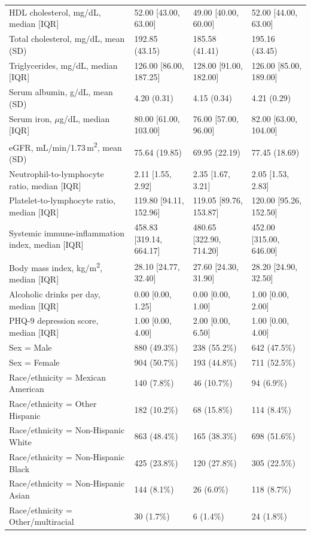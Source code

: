 \documentclass[12pt]{article}
\begin{document}
\begin{singlespace}
\begin{longtable}{p{6.6cm}R{2.6cm}R{2.6cm}R{2.6cm}}
HDL cholesterol, mg/dL, median [IQR] & 52.00 [43.00, 63.00] & 49.00 [40.00, 60.00] & 52.00 [44.00, 63.00] \\
Total cholesterol, mg/dL, mean (SD) & 192.85 (43.15) & 185.58 (41.41) & 195.16 (43.45) \\
Triglycerides, mg/dL, median [IQR] & 126.00 [86.00, 187.25] & 128.00 [91.00, 182.00] & 126.00 [85.00, 189.00] \\
Serum albumin, g/dL, mean (SD) & 4.20 (0.31) & 4.15 (0.34) & 4.21 (0.29) \\
Serum iron, $\mu$g/dL, median [IQR] & 80.00 [61.00, 103.00] & 76.00 [57.00, 96.00] & 82.00 [63.00, 104.00] \\
eGFR, mL/min/1.73\,m\textsuperscript{2}, mean (SD) & 75.64 (19.85) & 69.95 (22.19) & 77.45 (18.69) \\
Neutrophil-to-lymphocyte ratio, median [IQR] & 2.11 [1.55, 2.92] & 2.35 [1.67, 3.21] & 2.05 [1.53, 2.83] \\
Platelet-to-lymphocyte ratio, median [IQR] & 119.80 [94.11, 152.96] & 119.05 [89.76, 153.87] & 120.00 [95.26, 152.50] \\
Systemic immune-inflammation index, median [IQR] & 458.83 [319.14, 664.17] & 480.65 [322.90, 714.20] & 452.00 [315.00, 646.00] \\
Body mass index, kg/m\textsuperscript{2}, median [IQR] & 28.10 [24.77, 32.40] & 27.60 [24.30, 31.90] & 28.20 [24.90, 32.50] \\
Alcoholic drinks per day, median [IQR] & 0.00 [0.00, 1.25] & 0.00 [0.00, 1.00] & 1.00 [0.00, 2.00] \\
PHQ-9 depression score, median [IQR] & 1.00 [0.00, 4.00] & 2.00 [0.00, 6.50] & 1.00 [0.00, 4.00] \\
Sex = Male & 880 (49.3\%) & 238 (55.2\%) & 642 (47.5\%) \\
Sex = Female & 904 (50.7\%) & 193 (44.8\%) & 711 (52.5\%) \\
Race/ethnicity = Mexican American & 140 (7.8\%) & 46 (10.7\%) & 94 (6.9\%) \\
Race/ethnicity = Other Hispanic & 182 (10.2\%) & 68 (15.8\%) & 114 (8.4\%) \\
Race/ethnicity = Non-Hispanic White & 863 (48.4\%) & 165 (38.3\%) & 698 (51.6\%) \\
Race/ethnicity = Non-Hispanic Black & 425 (23.8\%) & 120 (27.8\%) & 305 (22.5\%) \\
Race/ethnicity = Non-Hispanic Asian & 144 (8.1\%) & 26 (6.0\%) & 118 (8.7\%) \\
Race/ethnicity = Other/multiracial & 30 (1.7\%) & 6 (1.4\%) & 24 (1.8\%) \\

\end{longtable}
\end{singlespace}
\end{document}
